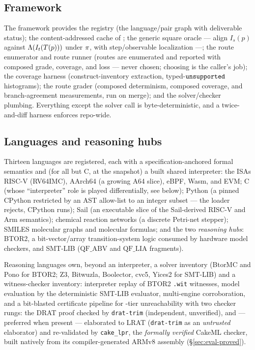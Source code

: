 \subsection{Framework}
The framework provides the registry (the language/pair graph with
deliverable status); the content-addressed cache of
; the generic square oracle
--- align $I_s(p)$ against $\Lambda(I_t(T(p)))$ under $\pi$, with
step/observable localization ---; the route enumerator and route runner (routes are
enumerated and reported with composed grade, coverage, and loss --- never
chosen; choosing is the caller's job); the coverage harness
(construct-inventory extraction, typed-$\mathtt{unsupported}$ histograms); the
route grader (composed determinism, composed coverage, and
branch-agreement measurements, run on merge); and the solver/checker
plumbing. Everything except the solver call is byte-deterministic, and
a twice-and-diff harness enforces  repo-wide.

\subsection{Languages and reasoning hubs}
Thirteen languages are registered, each with a specification-anchored
formal semantics and (for all but C, at the snapshot) a built shared
interpreter: the ISAs RISC-V (RV64IMC), AArch64 (a growing A64 slice),
eBPF, Wasm, and EVM; C (whose ``interpreter'' role is played
differentially, see below); Python (a pinned CPython restricted by an AST
allow-list to an integer subset --- the loader rejects, CPython runs);
Sail (an executable slice of the Sail-derived RISC-V and Arm semantics);
chemical reaction networks (a discrete Petri-net stepper); SMILES
molecular graphs and molecular formulas; and the two \emph{reasoning
hubs}: BTOR2, a bit-vector/array transition-system logic consumed by
hardware model checkers, and SMT-LIB ($\mathrm{QF\_ABV}$ and
$\mathrm{QF\_LIA}$ fragments).

Reasoning languages own, beyond an interpreter, a solver inventory
(BtorMC and Pono for BTOR2; Z3, Bitwuzla, Boolector, cvc5, Yices2 for
SMT-LIB) and a witness-checker inventory: interpreter replay of BTOR2
\texttt{.wit} witnesses, model evaluation by the deterministic SMT-LIB
evaluator, multi-engine corroboration, and a bit-blasted certificate
pipeline for \tprov-tier unreachability with two checker rungs: the
DRAT proof checked by \texttt{drat-trim} (independent, unverified),
and --- preferred when present --- elaborated to LRAT
(\texttt{drat-trim} as an \emph{untrusted} elaborator) and re-validated
by \texttt{cake\_lpr}, the \emph{formally verified} CakeML checker,
built natively from its compiler-generated ARMv8 assembly
(\S\ref{sec:eval-proved}).


